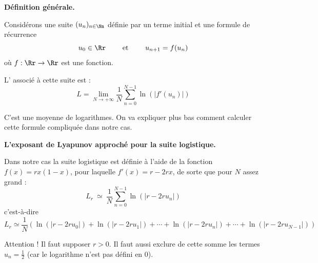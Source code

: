\documentclass[11pt,class=report,crop=false]{standalone}
\begin{document}
\begin{cours}



\textbf{Définition générale.}

Considérons une suite $(u_n)_{n\in\Nn}$ définie par un terme initial et une formule de récurrence
$$u_0\in \Rr \qquad \text{ et } \qquad u_{n+1} = f(u_n)$$
où $f : \Rr \to \Rr$ est une fonction.

L' associé à cette suite est :
$$L = \lim_{N\to+\infty} \frac1N \sum_{n=0}^{N-1} \ln\left( \big| f'(u_n) \big| \right)$$

C'est une moyenne de logarithmes. On va expliquer plus bas comment calculer cette formule compliquée dans notre cas.

\bigskip

\textbf{L'exposant de Lyapunov approché pour la suite logistique.}

Dans notre cas la suite logistique est définie à l'aide de la fonction $f(x) = rx(1-x)$, pour laquelle $f'(x) = r - 2rx$, de sorte que pour $N$ assez grand :
$$L_r \ \simeq \ \frac 1N  \sum_{n=0}^{N-1}  \ln\left(\big| r-2ru_n  \big| \right)$$
c'est-à-dire
$$L_r \simeq \frac 1N \left( 
\ln\left(\big| r-2ru_0  \big| \right) + 
\ln\left(\big| r-2ru_1  \big| \right) + \cdots +
\ln\left(\big| r-2ru_n  \big| \right) + \cdots +
\ln\left(\big| r-2ru_{N-1}  \big| \right)
\right)$$ 

Attention ! Il faut supposer $r>0$. Il faut aussi exclure de cette somme les termes $u_n=\frac12$ (car le logarithme n'est pas défini en $0$).

%



\end{cours}


\end{document}
